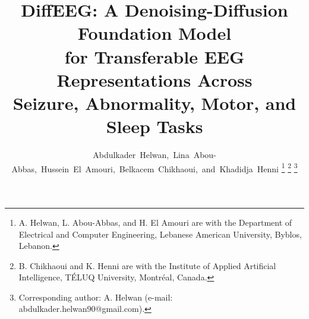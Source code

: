 \documentclass[journal]{IEEEtran}
\begin{document}
\title{DiffEEG: A Denoising-Diffusion Foundation Model\\
for Transferable EEG Representations Across\\
Seizure, Abnormality, Motor, and Sleep Tasks}

\author{Abdulkader~Helwan,~Lina~Abou-Abbas,~Hussein~El~Amouri,~Belkacem~Chikhaoui,~and~Khadidja~Henni
\thanks{A. Helwan, L. Abou-Abbas, and H. El Amouri are with the Department of Electrical and Computer Engineering, Lebanese American University, Byblos, Lebanon.}
\thanks{B. Chikhaoui and K. Henni are with the Institute of Applied Artificial Intelligence, TÉLUQ University, Montréal, Canada.}
\thanks{Corresponding author: A. Helwan (e-mail: abdulkader.helwan90@gmail.com).}}


\maketitle
\end{document}
